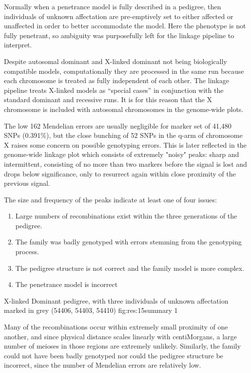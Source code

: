 Normally when a penetrance model is fully described in a pedigree, then individuals of unknown affectation are pre-emptively set to either affected or unaffected in order to better accommodate the model.  Here the phenotype is not fully penetrant, so ambiguity was purposefully left for the linkage  pipeline to interpret.

Despite autosomal dominant and X-linked dominant not being biologically compatible models, computationally they are processed in the same run because each chromosome is treated as fully independent of each other. The linkage pipeline treats X-linked models as “special cases” in conjunction with the standard dominant and recessive runs. It is for this reason that the X chromosome is included with autosomal chromosomes in the genome-wide plots.

The low 162 Mendelian errors are usually negligible for marker set of 41,480 SNPs (0.391\%), but the close bunching of 52 SNPs in the q-arm of chromosome X raises some concern on possible genotyping errors. This is later reflected in the genome-wide linkage plot which consists of extremely "noisy" peaks: sharp and intermittent, consisting of no more than two markers before the signal is lost and drops below significance, only to resurrect again within close proximity of the previous signal.

The size and frequency of the peaks indicate at least one of four issues:
\begin{spacing}{1.2}
\begin{enumerate}
\item{Large numbers of recombinations exist within the three generations of the pedigree.}
\item{The family was badly genotyped with errors stemming from the genotyping process.}
\item{The pedigree structure is not correct and the family model is more complex.}
\item{The penetrance model is incorrect}
\end{enumerate}
\end{spacing}

{X-linked Dominant pedigree, with three individuals of unknown affectation marked in grey (54406, 54403, 54410)}
{fig:res:15summary}
{1}

Many of the recombinations occur within extremely small proximity of one another, and since physical distance scales linearly with centiMorgans, a large number of meioses in those regions are extremely unlikely. Similarly,  the family could not have been badly genotyped nor could the pedigree structure be incorrect, since the number of Mendelian errors are relatively low.

